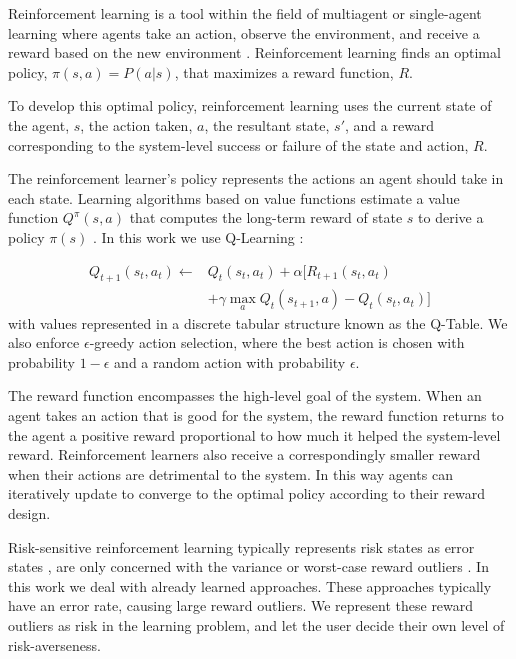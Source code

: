 \documentclass[letterpaper, 10 pt, conference]{ieeeconf}  %
\begin{document}
Reinforcement learning is a tool within the field of multiagent or single-agent learning where agents take an action, observe the environment, and receive a reward based on the new environment \cite{Sutton98reinforcementlearning}. Reinforcement learning finds an optimal policy, $\pi(s,a) = P(a|s)$, that maximizes a reward function, $R$.

To develop this optimal policy, reinforcement learning uses the current state of the agent, $s$, the action taken, $a$, the resultant state, $s'$, and a reward corresponding to the system-level success or failure of the state and action, $R$.


The reinforcement learner's policy represents the actions an agent should take in each state. Learning algorithms based on value functions estimate a value function $Q^\pi(s,a)$ that computes the long-term reward of state $s$ to derive a policy $\pi(s)$ \cite{Kalyanakrishnan:2009:EAV:1558109.1558115}. In this work we use Q-Learning \cite{Sutton98reinforcementlearning}:

\begin{align*}
Q_{t+1}(s_t,a_t) \leftarrow & Q_t(s_t,a_t) + \alpha [R_{t+1}(s_t,a_t) \\
 & + \gamma \max_a Q_t(s_{t+1},a) - Q_t(s_t,a_t)]
\end{align*}
with values represented in a discrete tabular structure known as the Q-Table. We also enforce $\epsilon$-greedy action selection, where the best action is chosen with probability $1 - \epsilon$ and a random action with probability $\epsilon$.

The reward function encompasses the high-level goal of the system. When an agent takes an action that is good for the system, the reward function returns to the agent a positive reward proportional to how much it helped the system-level reward. Reinforcement learners also receive a correspondingly smaller reward when their actions are detrimental to the system. In this way agents can iteratively update to converge to the optimal policy according to their reward design.

Risk-sensitive reinforcement learning typically represents risk states as error states \cite{Geibel:2005:RRL:1622519.1622522}, are only concerned with the variance \cite{Borkar:2002:QRC:767822.769466, Liu:2003:RAA:860575.860632} or worst-case reward outliers \cite{Coraluppi1999301}. In this work we deal with already learned approaches. These approaches typically have an error rate, causing large reward outliers. We represent these reward outliers as risk in the learning problem, and let the user decide their own level of risk-averseness.
\end{document}
